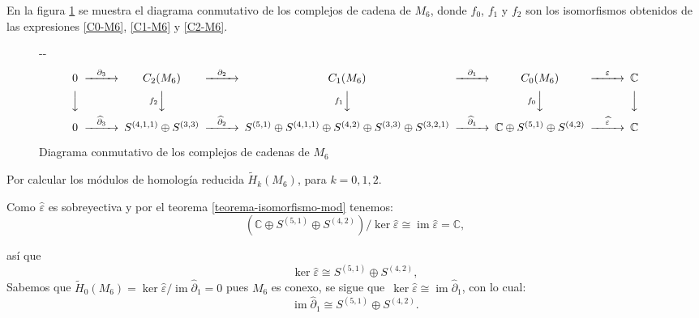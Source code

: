 \documentclass[12pt]{book}
\newlength{\offsetpage}
\newenvironment{widepage}{\begin{adjustwidth}{-\offsetpage}{-\offsetpage}%
    \addtolength{\textwidth}{2\offsetpage}}%
{\end{adjustwidth}}
\theoremstyle{definition}
\DeclareMathOperator{\im}{im}
\newcounter{in}
\begin{document}
  En la figura \ref{fig:diagrama-conmutativo6} se muestra el diagrama
  conmutativo de los complejos de cadena de $M_{6}$, donde $f_{0}$,
  $f_{1}$ y $f_{2}$ son los isomorfismos obtenidos de las expresiones
  \ref{C0-M6}, \ref{C1-M6} y \ref{C2-M6}.

  \begin{figure}[h]
    \centering
    \begin{widepage}
      \scriptsize{
        \[
        \begin{CD}
          0 @>{\partial_{3}}>> C_{2}(M_{6}) @>{\partial_{2}}>> C_{1}(M_{6}) @>{\partial_{1}}>> C_{0}(M_{6}) @>{\varepsilon}>> \mathbb{C}\\
          @VVV @Vf_{2}VV   @Vf_{1}VV  @Vf_{0}VV  @VVV    \\
          0 @>{\widehat\partial_{3}}>> S^{(4,1,1)}\oplus S^{(3,3)}
          @>{\widehat\partial_{2}}>> S^{(5,1)}\oplus S^{(4,1,1)}\oplus
          S^{(4,2)}\oplus S^{(3,3)}\oplus S^{(3,2,1)}
          @>{\widehat\partial_{1}}>> \mathbb{C} \oplus S^{(5,1)}\oplus
          S^{(4,2)} @>{\widehat \varepsilon}>> \mathbb{C}
        \end{CD}
        \]
      }
    \end{widepage}
\caption{Diagrama conmutativo de los complejos de cadenas de $M_{6}$}
\label{fig:diagrama-conmutativo6}
\end{figure}

Por calcular los módulos de homología reducida $\widetilde
H_{k}(M_{6})$, para $k=0,1,2$.

Como $\widehat\varepsilon$ es sobreyectiva y por el teorema \ref{teorema-isomorfismo-mod} tenemos:
\begin{equation*}
  (\mathbb{C} \oplus S^{(5,1)}\oplus S^{(4,2)})/\ker\widehat\varepsilon\cong \im \widehat\varepsilon=\mathbb{C},
\end{equation*}

así que
\begin{equation*}
  \label{ker0-M6}
  \ker\widehat\varepsilon\cong  S^{(5,1)}\oplus S^{(4,2)}, 
\end{equation*}
Sabemos que $\widetilde H_{0}(M_{6})=\ker \widehat\varepsilon/\im
\widehat\partial_{1}=0$ pues $M_{6}$ es conexo, se sigue que~$\ker \widehat\varepsilon\cong
\im\widehat\partial_{1}$, con lo cual:
\begin{equation}
  \label{im1-M6}
  \im \widehat\partial_{1}\cong  S^{(5,1)}\oplus S^{(4,2)}. 
\end{equation}
\end{document}

